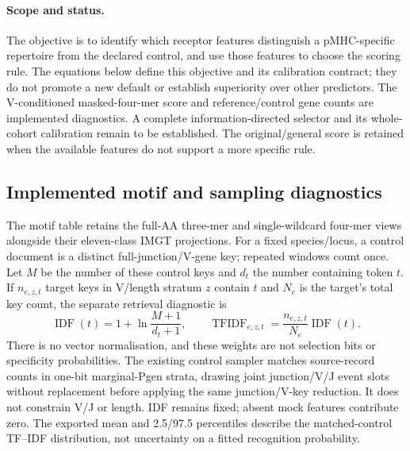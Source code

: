 \documentclass[10pt,a4paper]{article}
\theoremstyle{definition}
\begin{document}
\paragraph{Scope and status.}
The objective is to identify which receptor features distinguish a pMHC-specific repertoire from the declared control, and use those features to choose the scoring rule.
The equations below define this objective and its calibration contract; they do not promote a new default or establish superiority over other predictors.
The V-conditioned masked-four-mer score and reference/control gene counts are implemented diagnostics.
A complete information-directed selector and its whole-cohort calibration remain to be established.
The original/general score is retained when the available features do not support a more specific rule.

\subsection{Implemented motif and sampling diagnostics}
The motif table retains the full-AA three-mer and single-wildcard four-mer views alongside their eleven-class IMGT projections.
For a fixed species/locus, a control document is a distinct full-junction/V-gene key; repeated windows count once.
Let $M$ be the number of these control keys and $d_t$ the number containing token $t$.
If $n_{e,z,t}$ target keys in V/length stratum $z$ contain $t$ and $N_e$ is the target's total key count, the separate retrieval diagnostic is
\[
 \operatorname{IDF}(t)=1+\ln\frac{M+1}{d_t+1},\qquad
 \operatorname{TFIDF}_{e,z,t}=\frac{n_{e,z,t}}{N_e}\operatorname{IDF}(t).
\]
There is no vector normalisation, and these weights are not selection bits or specificity probabilities.
The existing control sampler matches source-record counts in one-bit marginal-Pgen strata, drawing joint junction/V/J event slots without replacement before applying the same junction/V-key reduction.
It does not constrain V/J or length.
IDF remains fixed; absent mock features contribute zero.
The exported mean and 2.5/97.5 percentiles describe the matched-control TF--IDF distribution, not uncertainty on a fitted recognition probability.
\end{document}
